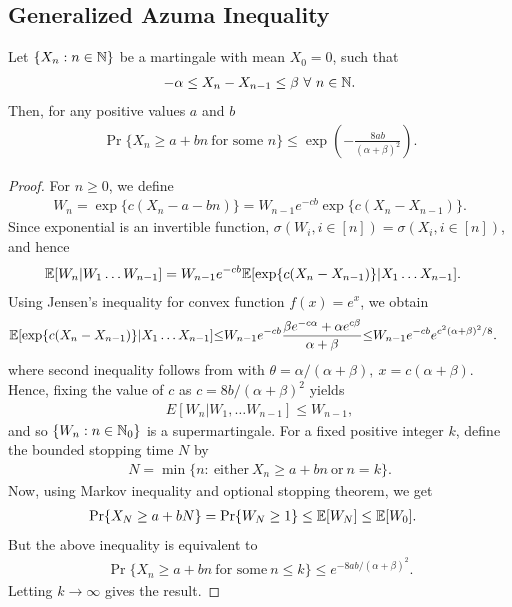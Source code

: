 \documentclass[a4paper,10pt,english]{article}
\begin{document}
\subsection{Generalized Azuma Inequality}
\begin{prop}
Let $\{X_n : n \in \mathbb{N} \}$ be a martingale with mean $X_0=0$, such that
\begin{align*}
-\alpha \leq X_n-X_{n-1} \leq \beta~ \forall ~n \in \mathbb{N}.
\end{align*}
Then, for any positive values $a$ and $b$
\begin{align*}
\label{GenAzumaLemma}
\Pr\{X_n \geq a+bn ~ \text{for some }n\} \leq \exp\left(-\frac{8ab}{({\alpha+\beta})^2}\right).
\end{align*}
\end{prop}
\begin{proof}
For $n \geq 0$, we define 
\begin{align*}
W_n = \exp\{c(X_n-a-bn)\} = W_{n-1}e^{-cb}\exp\{c(X_n-X_{n-1})\}.
\end{align*}
Since exponential is an invertible function, $\sigma(W_i, i \in [n]) = \sigma(X_i, i \in [n])$, and hence 
\begin{align*}
\mathbb{E}[W_n|W_1 \hdots W_{n-1}]&=W_{n-1}e^{-cb}\mathbb{E}[\exp\{c(X_n-X_{n-1})\}|X_1 \hdots X_{n-1}].
\end{align*}
Using Jensen's inequality for convex function $f(x) = e^x$, we obtain
\begin{align*}
\mathbb{E}[\exp\{c(X_n-X_{n-1})\}|X_1 \hdots X_{n-1}]
&{\leq} W_{n-1}e^{-cb}\frac{\beta e^{-c\alpha} + \alpha e^{c\beta}}{\alpha+\beta} {\leq} W_{n-1}e^{-cb}e^{c^2{(\alpha+\beta)}^2/8}.
\end{align*}
where second inequality follows from with $\theta=\alpha/(\alpha+\beta),~x=c(\alpha+\beta)$. 
Hence, fixing the value of $c$ as $c=8b/{(\alpha+\beta)}^2$ yields 
\begin{align}
E[W_n|W_1, \hdots W_{n-1}] \leq W_{n-1},
\end{align}
and so $\{W_n: n \in \mathbb{N}_0\}$ is a supermartingale. 
For a fixed positive integer $k$, define the bounded stopping time $N$ by 
\begin{align*}
N= \min\{n: ~\text{either}~ X_n \geq a+bn ~ \text{or}~ n=k \}.
\end{align*} 
Now, using Markov inequality and optional stopping theorem, we get
\begin{align*}
\Pr\{X_N \geq a+bN\}&= \Pr\{W_N \geq 1\} \leq \mathbb{E}[W_N] \leq \mathbb{E}[W_0].
\end{align*}
But the above inequality is equivalent to
\begin{align*}
\Pr\{X_n \geq a+bn ~ \text{for some}~ n \leq k\} \leq e^{-8ab/{(\alpha+\beta)}^2}.
\end{align*}
Letting $k \rightarrow \infty$ gives the result.
\end{proof}
\end{document}

